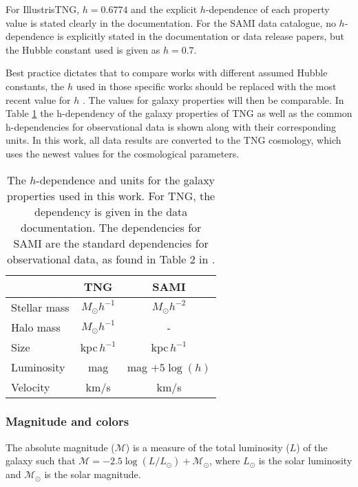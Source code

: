 For IllustrisTNG, $h=0.6774$ and the explicit $h$-dependence of each property value is stated clearly in the documentation. For the SAMI data catalogue, no $h$-dependence is explicitly stated in the documentation or data release papers, but the Hubble constant used is given as $h = 0.7$.

Best practice dictates that to compare works with different assumed Hubble constants, the $h$ used in those specific works should be replaced with the most recent value for $h$ \parencite{Croton2013}. The values for galaxy properties will then be comparable. In Table \ref{h_dependence} the h-dependency of the galaxy properties of TNG as well as the common h-dependencies for observational data is shown along with their corresponding units. In this work, all data results are converted to the TNG cosmology, which uses the newest values for the cosmological parameters.

\begin{table}
\begin{center}
\caption{The $h$-dependence and units for the galaxy properties used in this work. For TNG, the dependency is given in the data documentation. The dependencies for SAMI are the standard dependencies for observational data, as found in Table 2 in \textcite{Croton2013}.}
\label{h_dependence}
\begin{tabular}{ l| c c }
 \hline
 \hline
   & TNG & SAMI \\
 \hline
 Stellar mass & $M_{\odot}h^{-1}$ & $M_{\odot}h^{-2}$ \\ 
 Halo mass & $M_{\odot}h^{-1}$ & - \\
 Size & kpc$\,h^{-1}$ & kpc$\,h^{-1}$ \\
 Luminosity & mag & mag $+5\log(h)$ \\
 Velocity & km/s & km/s  \\ 

 \hline 
\end{tabular}
\end{center}
\end{table}


\subsubsection{Magnitude and colors}
The absolute magnitude ($\mathcal{M}$) is a measure of the total luminosity ($L$) of the galaxy such that $\mathcal{M} = -2.5 \log(L/L_\odot) + \mathcal{M}_\odot$, where $L_\odot$ is the solar luminosity and $\mathcal{M}_\odot$ is the solar magnitude.

